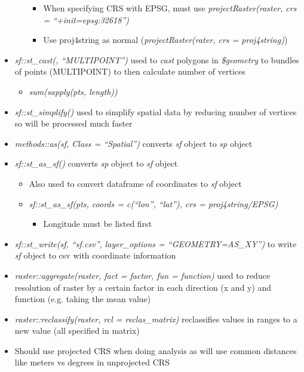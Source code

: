 \documentclass{article}
\begin{document}
\begin{itemize}
\begin{itemize}
\begin{itemize}
            \item When specifying CRS with EPSG, must use \textit{projectRaster(raster, crs = ``+init=epsg:32618'')}
            \item Use proj4string as normal (\textit{projectRaster(rater, crs = proj4string)})
        \end{itemize}
    \end{itemize}
    \item \textit{sf::st\_cast(, ``MULTIPOINT'')} used to \textit{cast} polygons in \textit{\$geometry} to bundles of points (MULTIPOINT) to then calculate number of vertices
    \begin{itemize}
        \item \textit{sum(sapply(pts, length))}
    \end{itemize}
    \item \textit{sf::st\_simplify()} used to simplify spatial data by reducing number of vertices so will be processed much faster
    \item \textit{methods::as(sf, Class = ``Spatial'')} converts \textit{sf} object to \textit{sp} object
    \item \textit{sf::st\_as\_sf()} converts \textit{sp} object to \textit{sf} object
    \begin{itemize}
        \item Also used to convert dataframe of coordinates to \textit{sf} object
        \item \textit{sf::st\_as\_sf(pts, coords = c(``lon'', ``lat''), crs = proj4string/EPSG)}
        \begin{itemize}
            \item Longitude must be listed first
        \end{itemize}
    \end{itemize}
    \item \textit{sf::st\_write(sf, ``sf.csv'', layer\_options = ``GEOMETRY=AS\_XY'')} to write \textit{sf} object to csv with coordinate information
    \item \textit{raster::aggregate(raster, fact = factor, fun = function)} used to reduce resolution of raster by a certain factor in each direction (x and y) and function (e.g. taking the mean value)
    \item \textit{raster::reclassify(raster, rcl = reclas\_matrix)} reclassifies values in ranges to a new value (all specified in matrix)
    \item Should use projected CRS when doing analysis as will use common distances like meters vs degrees in unprojected CRS

\end{itemize}
\end{document}
